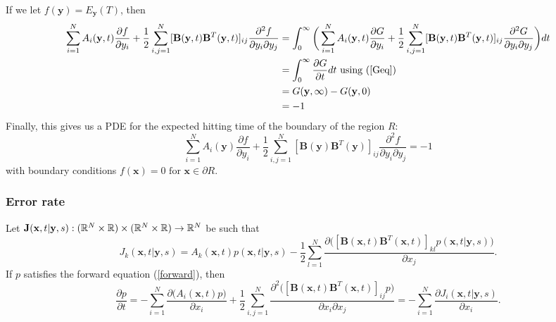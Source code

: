 \documentclass{article}
\newcommand{\mb}{\mathbf}
\begin{document}
If we let $f({\mathbf y})=E_{\mathbf y}(T)$, then 
\begin{align*}
\sum_{i=1}^NA_i({\mb y},t)\frac{\partial f}{\partial y_i}+\frac{1}{2}\sum_{i,j=1}^N[{\mb B}({\mb y},t){\mb B}^T({\mb y},t)]_{ij}\frac{\partial^2 f}{\partial y_i\partial y_j}&=\int_0^\infty\bigg(\sum_{i=1}^NA_i({\mb y},t)\frac{\partial G}{\partial y_i}+\frac{1}{2}\sum_{i,j=1}^N[{\mb B}({\mb y},t){\mb B}^T({\mb y},t)]_{ij}\frac{\partial^2 G}{\partial y_i\partial y_j}\bigg)dt
\\&=\int_0^\infty\frac{\partial G}{\partial t}dt \text{ using (\ref{Geq})}
\\&=G({\mb y},\infty)-G({\mb y},0)
\\&=-1
\end{align*}
Finally, this gives us a PDE for the expected hitting time of the boundary of the region $R$:
\begin{equation}
\sum_{i=1}^NA_i({\mb y})\frac{\partial f}{\partial y_i}+\frac{1}{2}\sum_{i,j=1}^N[{\mb B}({\mb y}){\mb B}^T({\mb y})]_{ij}\frac{\partial^2 f}{\partial y_i\partial y_j}=-1 \label{DT}
\end{equation}
with boundary conditions $f({\mb x})=0 \text{ for } {\mb x}\in\partial R$.

\subsubsection{Error rate }
Let ${\mb J}({\mb x},t|{\mb y},s):(\R^N\times\R)\times(\R^N\times\R)\to \R^N$ be such that 
$$J_k({\mb x},t|{\mb y},s)=A_k({\mb x},t)p({\mb x},t|{\mb y},s)-\frac{1}{2}\sum_{l=1}^N\frac{\partial \big([{\mb B}({\mb x},t){\mb B}^T({\mb x},t)]_{kl}p({\mb x},t|{\mb y},s)\big)}{\partial x_j}.$$ 
If $p$ satisfies the forward equation (\ref{forward}), then 
\begin{equation}
\frac{\partial p}{\partial t} =-\sum_{i=1}^N\frac{\partial \big(A_i({\mb x},t)p\big)}{\partial x_i}+\frac{1}{2}\sum_{i,j=1}^N\frac{\partial^2\big([{\mb B}({\mb x},t){\mb B}^T({\mb x},t)]_{ij}p\big)}{\partial x_i\partial x_j}=-\sum_{i=1}^N\frac{\partial J_i({\mb x},t|{\mb y},s)}{\partial x_i}. \label{jequals}
\end{equation}
\end{document}
